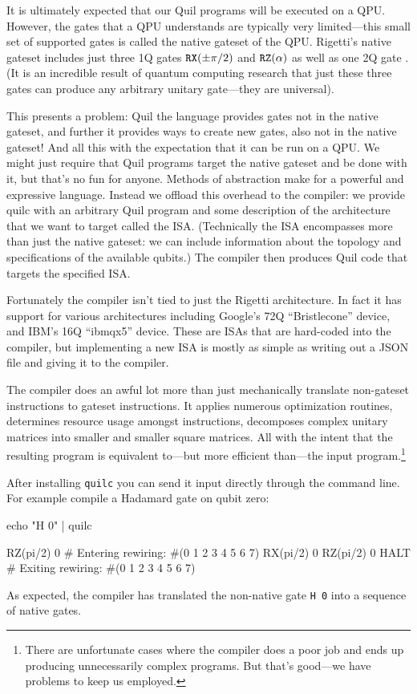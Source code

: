 It is ultimately expected that our Quil programs will be executed on a QPU. However, the gates that a QPU understands are typically very limited---this small set of supported gates is called the native gateset of the QPU. Rigetti's native gateset includes just three 1Q gates $\mathtt{RX}(\pm\pi/2)$ and $\mathtt{RZ}(\alpha)$ as well as one 2Q gate \CZ{}. (It is an incredible result of quantum computing research that just these three gates can produce any arbitrary unitary gate---they are universal). 

This presents a problem: Quil the language provides gates not in the native gateset, and further it provides ways to create new gates, also not in the native gateset! And all this with the expectation that it can be run on a QPU. We might just require that Quil programs target the native gateset and be done with it, but that's no fun for anyone. Methods of abstraction make for a powerful and expressive language. Instead we offload this overhead to the compiler: we provide quilc with an arbitrary Quil program and some description of the architecture that we want to target called the ISA. (Technically the ISA encompasses more than just the native gateset: we can include information about the topology and specifications of the available qubits.) The compiler then produces Quil code that targets the specified ISA.

Fortunately the compiler isn't tied to just the Rigetti architecture. In fact it has support for various architectures including Google's 72Q ``Bristlecone'' device, and IBM's 16Q ``ibmqx5'' device. These are ISAs that are hard-coded into the compiler, but implementing a new ISA is mostly as simple as writing out a JSON file and giving it to the compiler.

The compiler does an awful lot more than just mechanically translate non-gateset instructions to gateset instructions. It applies numerous optimization routines, determines resource usage amongst instructions, decomposes complex unitary matrices into smaller and smaller square matrices. All with the intent that the resulting program is equivalent to---but more efficient than---the input program.\footnote{There are unfortunate cases where the compiler does a poor job and ends up producing unnecessarily complex programs. But that's good---we have problems to keep us employed.}

After installing \verb|quilc| you can send it input directly through the command line. For example compile a Hadamard gate on qubit zero:
\begin{bash}
echo "H 0" | quilc

RZ(pi/2) 0                  # Entering rewiring: #(0 1 2 3 4 5 6 7)
RX(pi/2) 0
RZ(pi/2) 0
HALT                        # Exiting rewiring: #(0 1 2 3 4 5 6 7)
\end{bash}
As expected, the compiler has translated the non-native gate \verb|H 0| into a sequence of native gates.

